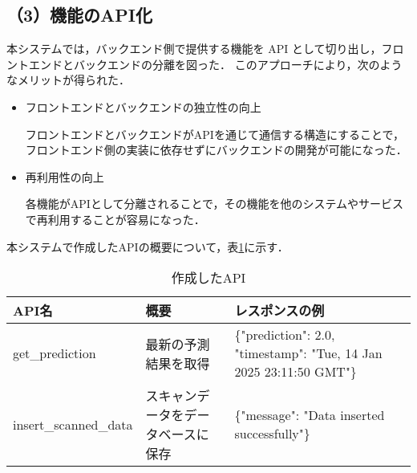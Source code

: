 \subsection*{（3）機能のAPI化}
本システムでは，バックエンド側で提供する機能を API として切り出し，フロントエンドとバックエンドの分離を図った．
このアプローチにより，次のようなメリットが得られた．

\begin{itemize}
	\item フロントエンドとバックエンドの独立性の向上
	
	フロントエンドとバックエンドがAPIを通じて通信する構造にすることで，フロントエンド側の実装に依存せずにバックエンドの開発が可能になった．
	
	\item 再利用性の向上
	 
	各機能がAPIとして分離されることで，その機能を他のシステムやサービスで再利用することが容易になった．
	
\end{itemize}

本システムで作成したAPIの概要について，表\ref{tbl:API}に示す．

\begin{table}[tb]
	\centering
	\caption{作成したAPI}
	\label{tbl:API}
	\small
	\doublerulesep=0.3pt
    \begin{tabular}{l|l|p{6cm}} \hline\hline\hline
		API名 & 概要 & レスポンスの例 \\ \hline
		get\_prediction & 最新の予測結果を取得 & \{"prediction": 2.0, "timestamp": "Tue, 14 Jan 2025 23:11:50 GMT"\} \\ \hline
		insert\_scanned\_data & スキャンデータをデータベースに保存 & \{"message": "Data inserted successfully"\} \\ \hline\hline\hline
	\end{tabular}
\end{table}